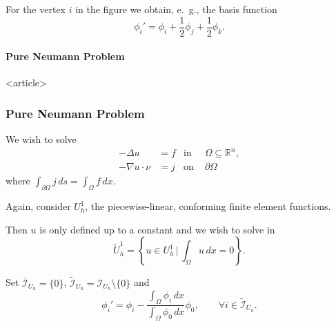 \begin{frame}
\begin{columns}
{\begin{column}{0.4\textwidth}
\end{column}}
\end{columns}
For the vertex $i$ in the figure we obtain, e.~g., the basis function
\begin{equation*}
\phi_i' = \phi_i + \frac12 \phi_j + \frac12 \phi_k .
\end{equation*}
\end{frame}


\paragraph{Pure Neumann Problem}

\begin{frame}<article>
\frametitle<presentation>{Pure Neumann Problem}
We wish to solve
\begin{align*}
                -\Delta u &= f& \text{in }& \Omega\subseteq\mathbb{R}^n,\\
     - \nabla u\cdot\nu   &= j& \text{on }& \partial\Omega
\end{align*}
where $\int_{\partial\Omega} j \, ds = \int_\Omega f \, dx$.

Again, consider $U_h^1$, the piecewise-linear, conforming finite
element functions.

Then $u$ is only defined up to a constant and we wish to solve in
\begin{equation*}
\tilde{U}^1_h = \left\{u \in U^1_h \,\Biggl |\, \int_\Omega u \, dx = 0\right\}.
\end{equation*}

Set $\bar{\mathcal{I}}_{U_h}=\{0\}$, $\tilde{\mathcal{I}}_{U_h}
= \mathcal{I}_{U_h}\setminus\{0\}$ and
\begin{equation*}
\phi_i' = \phi_i - \frac{\int_\Omega\phi_i\, dx}{\int_\Omega\phi_0\,
dx} \phi_0, \qquad \forall i\in\tilde{\mathcal{I}}_{U_h}.
\end{equation*}
\end{frame}

